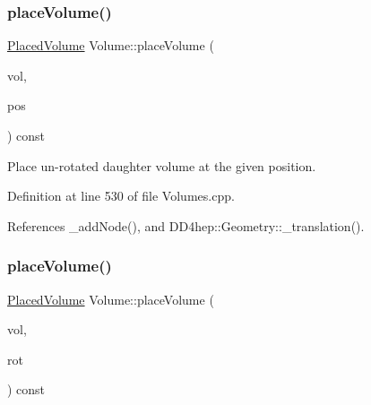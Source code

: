 \subsubsection{\texorpdfstring{place\+Volume()}{placeVolume()}\hspace{0.1cm}{\footnotesize\ttfamily [3/5]}}
{\footnotesize\ttfamily \hyperlink{class_d_d4hep_1_1_geometry_1_1_placed_volume}{Placed\+Volume} Volume\+::place\+Volume (\begin{DoxyParamCaption}\item[{const \hyperlink{class_d_d4hep_1_1_geometry_1_1_volume}{Volume} \&}]{vol,  }\item[{const \hyperlink{namespace_d_d4hep_1_1_geometry_a55083902099d03506c6db01b80404900}{Position} \&}]{pos }\end{DoxyParamCaption}) const}



Place un-\/rotated daughter volume at the given position. 



Definition at line 530 of file Volumes.\+cpp.



References \+\_\+add\+Node(), and D\+D4hep\+::\+Geometry\+::\+\_\+translation().

\hypertarget{class_d_d4hep_1_1_geometry_1_1_volume_ad7536b9cb994732af231729f5ab75ce5}{}\label{class_d_d4hep_1_1_geometry_1_1_volume_ad7536b9cb994732af231729f5ab75ce5} 
\subsubsection{\texorpdfstring{place\+Volume()}{placeVolume()}\hspace{0.1cm}{\footnotesize\ttfamily [4/5]}}
{\footnotesize\ttfamily \hyperlink{class_d_d4hep_1_1_geometry_1_1_placed_volume}{Placed\+Volume} Volume\+::place\+Volume (\begin{DoxyParamCaption}\item[{const \hyperlink{class_d_d4hep_1_1_geometry_1_1_volume}{Volume} \&}]{vol,  }\item[{const \hyperlink{namespace_d_d4hep_1_1_geometry_a24667b2b9c3cec3d5239828db4d52189}{Rotation\+Z\+YX} \&}]{rot }\end{DoxyParamCaption}) const}



